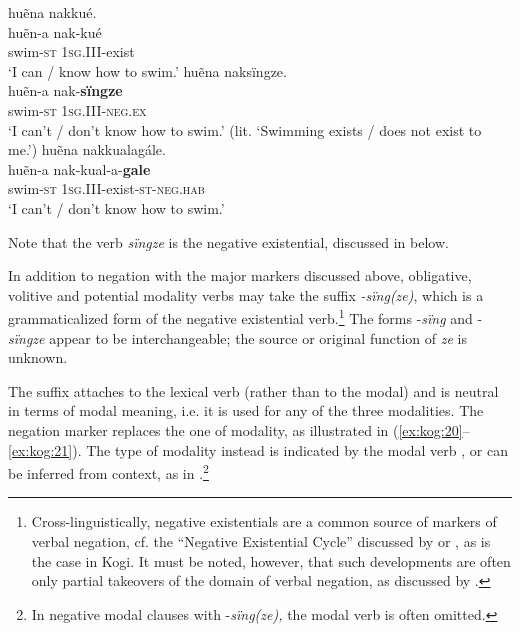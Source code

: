\documentclass[output=paper,colorlinks,citecolor=brown]{langscibook}
\begin{document}
\ea\label{ex:kog:19}
    \ea huẽna nakkué. \label{ex:kog:19a}\\
        huẽn-a nak-kué\\
        \gl  swim\textsc{{}-st 1sg.III{}-}exist\\ 
        \glt ‘I can / know how to swim.’
    \ex huẽna naksïngze.\label{ex:kog:19b}\\
        huẽn-a nak-\textbf{sïngze} \\
        \gl  swim\textsc{{}-st 1sg.III{}-neg.ex}\\ 
        \glt ‘I can't / don't know how to swim.’ (lit. ‘Swimming exists / does not exist to me.’)
    \ex huẽna nakkualagále. \label{ex:kog:19c}\\
        huẽn-a nak-kual-a-\textbf{gale}\\
        \gl  swim\textsc{{}-st 1sg.III{}-}exist\textsc{{}-st-neg.hab}\\
        \glt  ‘I can't / don't know how to swim.’
    \z
\z 

Note that the verb \textit{sïngze} is the negative existential, discussed in  below.

In addition to negation with the major markers discussed above, obligative, volitive and potential modality verbs may take the suffix \textit{{}-sïng(ze)}, which is a grammaticalized form of the negative existential verb.\footnote{Cross-linguistically, negative existentials are a common source of markers of verbal negation, cf. the “Negative Existential Cycle” discussed by \citet{Croft1991} or \citet{Veselinova2014}, as is the case in Kogi. It must be noted, however, that such developments are often only partial takeovers of the domain of verbal negation, as discussed by \citet{Veselinova2016}.} The forms -\textit{sïng} and -\textit{sïngze} appear to be interchangeable; the source or original function of \textit{ze} is unknown.

The suffix attaches to the lexical verb (rather than to the modal) and is neutral in terms of modal meaning, i.e. it is used for any of the three modalities. The negation marker replaces the one of modality, as illustrated in (\ref{ex:kog:20}--\ref{ex:kog:21}). The type of modality instead is indicated by the modal verb , or can be inferred from context, as in .\footnote{In negative modal clauses with -\textit{sïng(ze),} the modal verb is often omitted.}
\end{document}
